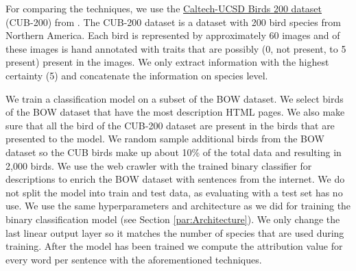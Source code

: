 \documentclass[a4paper, 12pt, oneside]{book} %
\begin{document}
For comparing the techniques, we use the \href{http://www.vision.caltech.edu/visipedia/CUB-200-2011.html}{Caltech-UCSD Birds 200 dataset} (CUB-200) from  \textcite{welinder_caltech-ucsd_2010}.
The CUB-200 dataset is a dataset with 200 bird species from Northern America.
Each bird is represented by approximately 60 images and of these images is hand annotated with traits that are possibly (0, not present, to 5 present) present in the images.
We only extract information with the highest certainty (5) and concatenate the information on species level.

We train a classification model on a subset of the BOW dataset.
We select birds of the BOW dataset that have the most description HTML pages.
We also make sure that all the bird of the CUB-200 dataset are present in the birds that are presented to the model.
We random sample additional birds from the BOW dataset so the CUB birds make up about 10\% of the total data and resulting in 2,000 birds.
We use the web crawler with the trained binary classifier for descriptions to enrich the BOW dataset with sentences from the internet.
We do not split the model into train and test data, as evaluating with a test set has no use.
We use the same hyperparameters and architecture as we did for training the binary classification model (see Section \ref{par:Architecture}).
We only change the last linear output layer so it matches the number of species that are used during training.
After the model has been trained we compute the attribution value for every word per sentence with the aforementioned techniques.

%
\end{document}
